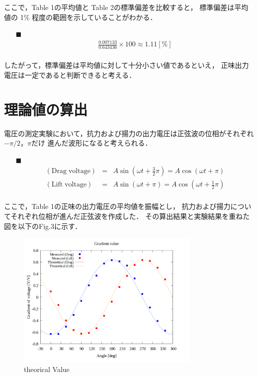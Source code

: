 \documentclass[twocolumn,a4j]{jsarticle}
\begin{document}
ここで，Table 1の平均値と Table 2の標準偏差を比較すると，
標準偏差は平均値の 1\% 程度の範囲を示していることがわかる．

\begin{itemize}
    \item [$\blacksquare$] 
    \begin{eqnarray*}
        \frac{0.007133}{0.643436} × 100 \approx 1.11 [\%]\\
    \end{eqnarray*}
\end{itemize}

したがって，標準偏差は平均値に対して十分小さい値であるといえ，
正味出力電圧は一定であると判断できると考える．

\section{理論値の算出}
電圧の測定実験において，抗力および揚力の出力電圧は正弦波の位相がそれぞれ$-\pi/2$，$\pi$だけ
進んだ波形になると考えられる．

\begin{itemize}
    \item [$\blacksquare$] 
    \begin{eqnarray*}
        \mathrm{(Drag\;voltage)} &=& A \sin\left(\omega t + \frac{3}{2}\pi\right) = A \cos\left(\omega t + \pi\right)\\
        \mathrm{(Lift\;voltage)} &=& A \sin\left(\omega t + \pi\right) = A \cos\left(\omega t + \frac{1}{2}\pi\right)\\
    \end{eqnarray*}
\end{itemize}

ここで，Table 1の正味の出力電圧の平均値を振幅とし，
抗力および揚力についてそれぞれ位相が進んだ正弦波を作成した．
その算出結果と実験結果を重ねた図を以下のFig.3に示す．

\begin{figure}[htbp]
    \footnotesize
    \begin{center}
        \includegraphics[width=88mm]{../images_2/20/20_adjust-value.png}
        \caption{theorical Value}
    \end{center}
\end{figure}
\end{document}
